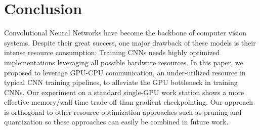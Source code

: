 \documentclass[11pt,onecolumn]{article}
\begin{document}
\section{Conclusion}

Convolutional Neural Networks have become the backbone of computer vision systems.
Despite their great success, one major drawback of these models is their intense resource consumption:
Training CNNs needs highly optimized implementations leveraging all possible hardware resources.
In this paper, we proposed to leverage GPU-CPU communication, 
an under-utilized resource in typical CNN training pipelines,
to alleviate the GPU bottleneck in training CNNs. 
Our experiment on a standard single-GPU work station shows a more
effective memory/wall time trade-off than gradient checkpointing.
Our approach is orthogonal to other resource optimization approaches 
such as pruning and quantization so these approaches can easily be combined in future work.



\end{document}
